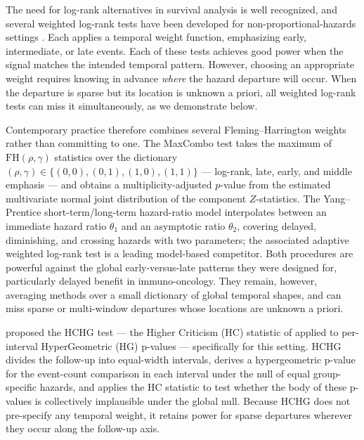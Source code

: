 \documentclass[unnumsec,webpdf,contemporary,large]{oup-authoring-template}
\begin{document}
The need for log-rank alternatives in survival analysis is well recognized,
and several weighted log-rank tests have been developed for non-proportional-hazards
settings \citep{gehan1965,peto1972,taroneware1977,harrington1982,flemingharrington1991}.
Each applies a temporal weight function, emphasizing early, intermediate,
or late events. Each of these tests achieves good power when the signal matches the intended temporal pattern. However, choosing an appropriate weight requires knowing in advance \emph{where} the hazard departure will occur. When the departure is sparse but its location is unknown a priori, all weighted log-rank tests can miss it simultaneously, as we demonstrate below.

Contemporary practice therefore combines several Fleming--Harrington weights rather than committing to one. The MaxCombo test \citep{lin2020maxcombo,ristl2021nph} takes the maximum of $\mathrm{FH}(\rho,\gamma)$ statistics over the dictionary $(\rho,\gamma)\in\{(0,0),(0,1),(1,0),(1,1)\}$ --- log-rank, late, early, and middle emphasis --- and obtains a multiplicity-adjusted $p$-value from the estimated multivariate normal joint distribution of the component $Z$-statistics. The Yang--Prentice short-term/long-term hazard-ratio model \citep{yang2005} interpolates between an immediate hazard ratio $\theta_1$ and an asymptotic ratio $\theta_2$, covering delayed, diminishing, and crossing hazards with two parameters; the associated adaptive weighted log-rank test \citep{yang2010improved} is a leading model-based competitor. Both procedures are powerful against the global early-versus-late patterns they were designed for, particularly delayed benefit in immuno-oncology. They remain, however, averaging methods over a small dictionary of global temporal shapes, and can miss sparse or multi-window departures whose locations are unknown a priori.

\citet{kipnis_biometrika} proposed the HCHG test — the Higher Criticism
(HC) statistic of \citet{donoho2004} applied to per-interval
HyperGeometric (HG) p-values — specifically for this setting. HCHG
divides the follow-up into equal-width intervals, derives a hypergeometric
p-value for the event-count comparison in each interval under the null of
equal group-specific hazards, and applies the HC statistic to test whether
the body of these p-values is collectively implausible
under the global null. Because HCHG does not pre-specify any temporal
weight, it retains power for sparse departures wherever they occur along
the follow-up axis.
\end{document}
